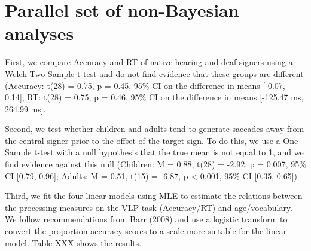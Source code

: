 \documentclass[oneside]{report}
\begin{document}
\section{Parallel set of non-Bayesian
analyses}\label{parallel-set-of-non-bayesian-analyses}

First, we compare Accuracy and RT of native hearing and deaf signers
using a Welch Two Sample t-test and do not find evidence that these
groups are different (Accuracy: t(28) = 0.75, p = 0.45, 95\% CI on the
difference in means {[}-0.07, 0.14{]}; RT: t(28) = 0.75, p = 0.46, 95\%
CI on the difference in means {[}-125.47 ms, 264.99 ms{]}.

Second, we test whether children and adults tend to generate saccades
away from the central signer prior to the offset of the target sign. To
do this, we use a One Sample t-test with a null hypothesis that the true
mean is not equal to 1, and we find evidence against this null
(Children: M = 0.88, t(28) = -2.92, p = 0.007, 95\% CI {[}0.79, 0.96{]};
Adults: M = 0.51, t(15) = -6.87, p \textless{} 0.001, 95\% CI {[}0.35,
0.65{]})

Third, we fit the four linear models using MLE to estimate the relations
between the processing measures on the VLP task (Accuracy/RT) and
age/vocabulary. We follow recommendations from Barr (2008) and use a
logistic transform to convert the proportion accuracy scores to a scale
more suitable for the linear model. Table XXX shows the results.
\begin{table}

\caption[Results for MLE models]{\label{tab:unnamed-chunk-11}Results for the four linear models fit using Maxiumum Likelihood Estimation. All p-values are one-sided to reflect our directional hypotheses about the VLP measures improving over development.}
\centering
{}
\end{table}
\end{document}
